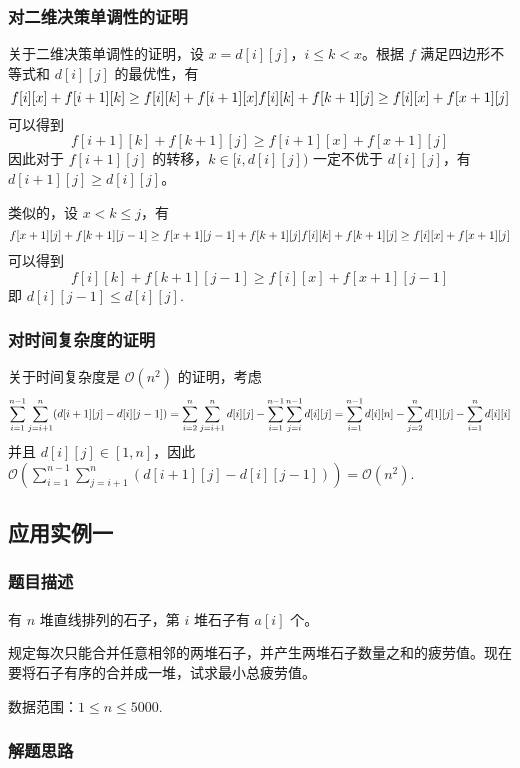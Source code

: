 \subsubsection{对二维决策单调性的证明}

关于二维决策单调性的证明，设 \(x=d[i][j]\)，\(i\le k\lt x\)。根据 \(f\)
满足四边形不等式和 \(d[i][j]\) 的最优性，有 \[
f[i][x]+f[i+1][k]\ge f[i][k]+f[i+1][x]\\
f[i][k]+f[k+1][j]\ge f[i][x]+f[x+1][j]
\] 可以得到 \[
f[i+1][k]+f[k+1][j]\ge f[i+1][x]+f[x+1][j]
\] 因此对于 \(f[i+1][j]\) 的转移，\(k\in [i,d[i][j])\) 一定不优于
\(d[i][j]\)，有 \(d[i+1][j]\ge d[i][j]\)。

类似的，设 \(x\lt k\le j\)，有 \[
f[x+1][j]+f[k+1][j-1]\ge f[x+1][j-1]+f[k+1][j]\\
f[i][k]+f[k+1][j]\ge f[i][x]+f[x+1][j]
\] 可以得到 \[
f[i][k]+f[k+1][j-1]\ge f[i][x]+f[x+1][j-1]
\] 即 \(d[i][j-1]\le d[i][j]\).

\subsubsection{对时间复杂度的证明}

关于时间复杂度是 \(\mathcal{O}(n^2)\) 的证明，考虑 \[
\sum_{i=1}^{n-1}\sum_{j=i+1}^n(d[i+1][j]-d[i][j-1])\\
=\sum_{i=2}^n\sum_{j=i+1}^nd[i][j]-\sum_{i=1}^{n-1}\sum_{j=i}^{n-1}d[i][j]\\
=\sum_{i=1}^{n-1}d[i][n]-\sum_{j=2}^nd[1][j]-\sum_{i=1}^nd[i][i]
\] 并且 \(d[i][j]\in[1,n]\)，因此
\(\mathcal{O}(\sum_{i=1}^{n-1}\sum_{j=i+1}^n(d[i+1][j]-d[i][j-1]))=\mathcal{O}(n^2)\).

\subsection{应用实例一}

\subsubsection{题目描述}

有 \(n\) 堆直线排列的石子，第 \(i\) 堆石子有 \(a[i]\) 个。

规定每次只能合并任意相邻的两堆石子，并产生两堆石子数量之和的疲劳值。现在要将石子有序的合并成一堆，试求最小总疲劳值。

数据范围：\(1\le n\le 5000\).

\subsubsection{解题思路}

